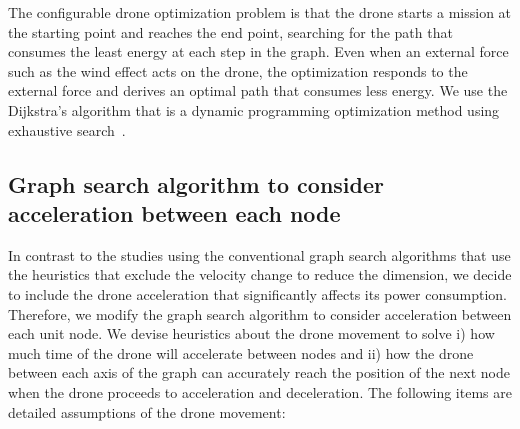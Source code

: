 \documentclass[journal]{./template/IEEEtran}
\begin{document}
The configurable drone optimization problem is that the drone starts a mission at the starting point and reaches the end point, searching for the path that consumes the least energy at each step in the graph. 
Even when an external force such as the wind effect acts on the drone, the optimization responds to the external force and derives an optimal path that consumes less energy.
We use the Dijkstra's algorithm that is a dynamic programming optimization method using exhaustive search~\cite{ref_19}. 





\subsection{Graph search algorithm to consider acceleration between each node}
\label{sub_Section: Graph search}
In contrast to the studies using the conventional graph search algorithms that use the heuristics that exclude the velocity change to reduce the dimension, we decide to include the drone acceleration that significantly affects its power consumption. 
Therefore, we modify the graph search algorithm to consider acceleration between each unit node. 
We devise heuristics about the drone movement to solve i) how much time of the drone will accelerate between nodes and ii) how the drone between each axis of the graph can accurately reach the position of the next node when the drone proceeds to acceleration and deceleration. 
The following items are detailed assumptions of the drone movement:
\end{document}
